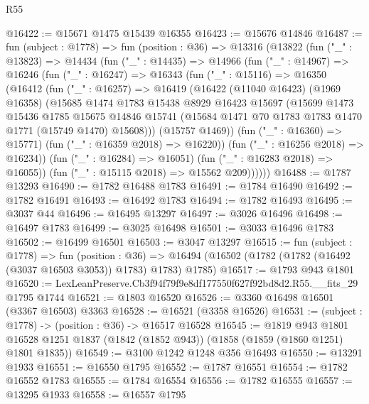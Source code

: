 \begin{lexlean}{R55}
\begin{coremodule}
@16422 := @15671 @1475 @15439 @16355
@16423 := @15676 @14846
@16487 := fun (subject : @1778) =>
  fun (position : @36) =>
  @13316
    (@13822
      (fun ("_" : @13823) =>
      @14434
        (fun ("_" : @14435) =>
        @14966
          (fun ("_" : @14967) =>
          @16246
            (fun ("_" : @16247) =>
            @16343
              (fun ("_" : @15116) =>
              @16350
                (@16412
                  (fun ("_" : @16257) =>
                  @16419
                    (@16422
                      (@11040 @16423)
                      (@1969 @16358)
                      (@15685
                        @1474
                        @1783
                        @15438
                        @8929
                        @16423
                        @15697
                        (@15699
                          @1473
                          @15436
                          @1785
                          @15675
                          @14846
                          @15741
                          (@15684 @1471 @70 @1783 @1783 @1470 @1771 (@15749 @1470) @15608)))
                      (@15757 @1469))
                    (fun ("_" : @16360) => @15771)
                    (fun ("_" : @16359 @2018) => @16220))
                  (fun ("_" : @16256 @2018) => @16234))
                (fun ("_" : @16284) => @16051)
                (fun ("_" : @16283 @2018) => @16055))
              (fun ("_" : @15115 @2018) => @15562 @209))))))
@16488 := @1787 @13293
@16490 := @1782 @16488 @1783
@16491 := @1784 @16490
@16492 := @1782 @16491
@16493 := @16492 @1783
@16494 := @1782 @16493
@16495 := @3037 @44
@16496 := @16495 @13297
@16497 := @3026 @16496
@16498 := @16497 @1783
@16499 := @3025 @16498
@16501 := @3033 @16496 @1783
@16502 := @16499 @16501
@16503 := @3047 @13297
@16515 := fun (subject : @1778) =>
  fun (position : @36) =>
  @16494 (@16502 (@1782 (@1782 (@16492 (@3037 @16503 @3053)) @1783) @1783) @1785)
@16517 := @1793 @943 @1801
@16520 := LexLeanPreserve.Cb3f94f79f9e8df177550f627f92bd8d2.R55.__fits_29 @1795 @1744
@16521 := @1803 @16520
@16526 := @3360 @16498 @16501 (@3367 @16503) @3363
@16528 := @16521 (@3358 @16526)
@16531 := (subject : @1778) -> (position : @36) -> @16517 @16528
@16545 := @1819
    @943
    @1801
    @16528
    @1251
    @1837
    (@1842 (@1852 @943))
    (@1858 (@1859 (@1860 @1251) @1801 @1835))
@16549 := @3100 @1242 @1248 @356 @16493
@16550 := @13291 @1933
@16551 := @16550 @1795
@16552 := @1787 @16551
@16554 := @1782 @16552 @1783
@16555 := @1784 @16554
@16556 := @1782 @16555
@16557 := @13295 @1933
@16558 := @16557 @1795

\end{coremodule}
\end{lexlean}
